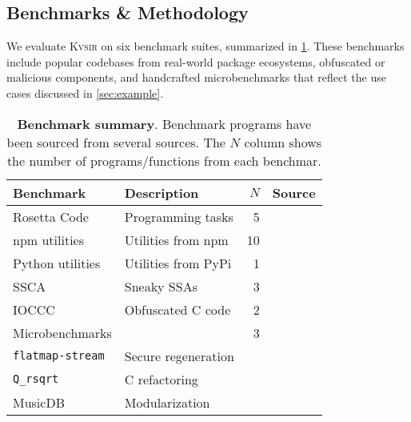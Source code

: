 \documentclass[sigplan]{acmart}
\newcommand{\sys}{{\scshape Kv{\textalpha}sir}\xspace}
\newcommand{\ttt}[1]{\texttt{#1}}
\begin{document}
\subsection{Benchmarks \& Methodology}

We evaluate \sys on six benchmark suites, summarized in \cref{tab:benchmarks}.
These benchmarks include popular codebases from real-world package ecosystems, obfuscated or malicious components, and handcrafted microbenchmarks that reflect the use cases discussed in \cref{sec:example}.

\begin{table}[h]
\centering
  \caption{\textbf{Benchmark summary}. 
  Benchmark programs have been sourced from several sources.
  The $N$ column shows the number of programs/functions from each benchmar.
  }
\begin{tabular}{llrl}
\toprule
Benchmark                                               & Description                    & $N$ & Source \\
\midrule
  Rosetta Code                                          & Programming tasks              & 5 & \cite{rosettacode} \\
  npm utilities                                           & Utilities from npm             & 10 & \cite{regbench2025} \\
Python utilities                                        & Utilities from PyPi            & 1 & \cite{regbench2025} \\
  SSCA                                                    & Sneaky SSAs    & 3 & \cite{ev:eurosec:2022, es1, ohm2020backstabber} \\
  IOCCC                                                   & Obfuscated C code              & 2 & \cite{ioccc} \\
Microbenchmarks                                         &          & 3    & \\
  \hspace{.5em} \ttt{flatmap-stream}                      & Secure regeneration            &      & \cite{es1}  \\
  \hspace{.5em} \ttt{Q_rsqrt}                             & C refactoring        &      & \cite{fast_inv_sqrt}  \\
  \hspace{.5em} \textsf{MusicDB}                          & Modularization           &      & \cite{codewithsadeemusicplayer} \\
\bottomrule
\end{tabular}
\label{tab:benchmarks}
\end{table}
\end{document}
